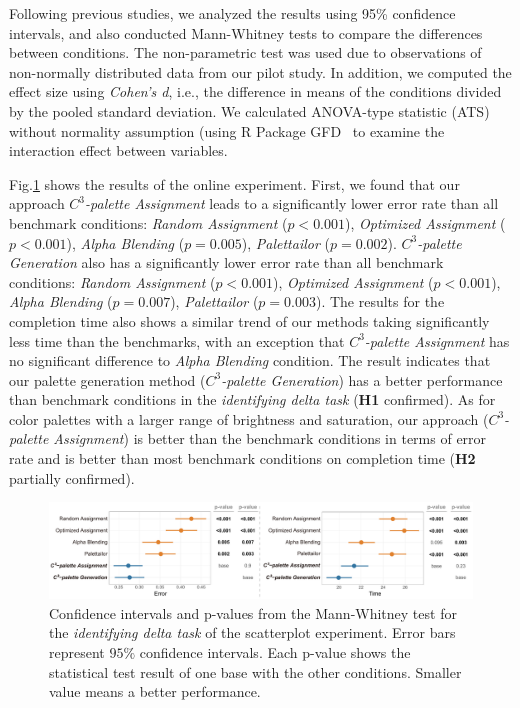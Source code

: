 {%
{}
Following previous studies, we analyzed the results using 95\% confidence intervals, and also conducted Mann-Whitney tests to compare the differences between conditions. The non-parametric test was used due to observations of non-normally distributed data from our pilot study. In addition, we computed the effect size using \emph{Cohen's d}, i.e., the difference in means of the conditions divided by the pooled standard deviation. We calculated ANOVA-type statistic (ATS) without normality assumption (using R Package GFD~\cite{gfd2017} to examine the interaction effect between variables.


Fig.\ref{fig:difference-results} shows the results of the online experiment.
First, we found that our approach \emph{$C^3$-palette Assignment} leads to a significantly lower error rate than all benchmark conditions: \emph{Random Assignment} ($p<0.001$), \emph{Optimized Assignment} ($p<0.001$), \emph{Alpha Blending} ($p=0.005$), \emph{Palettailor} ($p=0.002$). \emph{$C^3$-palette Generation} also has a significantly lower error rate than all benchmark conditions: \emph{Random Assignment} ($p<0.001$), \emph{Optimized Assignment} ($p<0.001$), \emph{Alpha Blending} ($p=0.007$), \emph{Palettailor} ($p=0.003$).
The results for the completion time also shows a similar trend of our methods taking significantly less time than the benchmarks, with an exception that \emph{$C^3$-palette Assignment} has no significant difference to \emph{Alpha Blending} condition.
The result indicates that our palette generation method (\emph{$C^3$-palette Generation}) has a better performance than benchmark conditions in the \emph{identifying delta task} (\textbf{H1} confirmed). As for color palettes with a larger range of brightness and saturation, our approach (\emph{$C^3$-palette Assignment}) is better than the benchmark conditions in terms of error rate and is better than most benchmark conditions on completion time (\textbf{H2} partially confirmed).

\begin{figure}[!tb]
\centering
\includegraphics[width=1\linewidth]{figures/difference-results.pdf}
\caption{Confidence intervals and p-values from the Mann-Whitney test for the \emph{identifying delta task} of the scatterplot experiment. Error bars represent $95\%$ confidence intervals. Each p-value shows the statistical test result of one base with the other conditions. Smaller value means a better performance.}
\vspace*{-3mm}
\label{fig:difference-results}
\end{figure}


}
